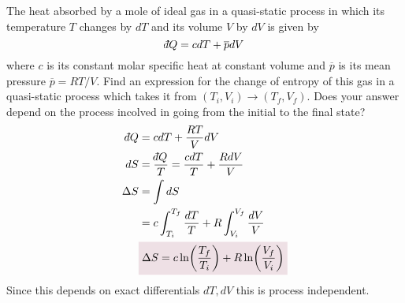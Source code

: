 \documentclass{article}
\def\dbar{{\mathchar'26\mkern-12mu d}} %
\begin{document}
\begin{problem}[Reif 4.3]
    The heat absorbed by a mole of ideal gas in a quasi-static process in which its temperature $T$ changes by $dT$ and its volume $V$ by $dV$ is given by $$\dbar Q=cdT+\overline{p}dV$$ where $c$ is its constant molar specific heat at constant volume and $\overline{p}$ is its mean pressure $\overline{p}=RT/V$. Find an expression for the change of entropy of this gas in a quasi-static process which takes it from $(T_i,V_i)\rightarrow(T_f,V_f)$. Does your answer depend on the process incolved in going from the initial to the final state?
    \answerline
    \begin{align*}
        \dbar Q &=cdT+\frac{RT}{V}dV
        \\
        dS &= \frac{\dbar Q}{T}=\frac{cdT}{T}+\frac{RdV}{V}
        \\
        \Delta S&=\int dS
        \\
        &= c\int_{T_i}^{T_f}\frac{dT}{T}+R\int_{V_i}^{V_f}\frac{dV}{V}
        \\
        &\coloredanswer{\Delta S= c\ln(\frac{T_f}{T_i})+R\ln(\frac{V_f}{V_i})}
    \end{align*}
    Since this depends on exact differentials $dT,dV$ this is process independent. 
\end{problem}\newpage
\end{document}
